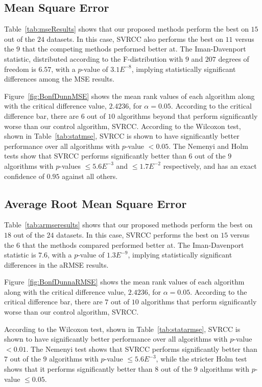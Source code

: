 \documentclass[reqno]{vcuthesis}
\numberwithin{equation}{chapter}
\begin{document}
\subsection{Mean Square Error}\label{subsec:mse}
Table~{\ref{tab:mseResults}} shows that our proposed methods perform the best on $15$ out of the $24$ datasets. In this case, SVRCC also performs the best on $11$ versus the $9$ that the competing methods performed better at. The Iman-Davenport statistic, distributed according to the F-distribution with $9$ and $207$ degrees of freedom is $6.57$, with a $p$-value of $3.1E^{-8}$, implying statistically significant differences among the MSE results.

Figure~{\ref{fig:BonfDunnMSE}} shows the mean rank values of each algorithm along with the critical difference value, $2.4236$, for $\alpha = 0.05$. According to the critical difference bar, there are $6$ out of $10$ algorithms beyond that perform significantly worse than our control algorithm, SVRCC. According to the Wilcoxon test, shown in Table~{\ref{tab:statmse}}, SVRCC is shown to have significantly better performance over all algorithms with $p$-value $< 0.05$. The Nemenyi and Holm tests show that SVRCC performs significantly better than $6$ out of the $9$ algorithms with $p$-values $\leq 5.6E^{-3}$ and $\leq 1.7E^{-2}$ respectively, and has an exact confidence of $0.95$ against all others.

\subsection{Average Root Mean Square Error}\label{subsec:armse}
Table~{\ref{tab:armseresults}} shows that our proposed methods perform the best on $18$ out of the $24$ datasets. In this case, SVRCC performs the best on $15$ versus the $6$ that the methods compared performed better at. The Iman-Davenport statistic is $7.6$, with a $p$-value of $1.3E^{-9}$, implying statistically significant differences in the aRMSE results.

Figure~{\ref{fig:BonfDunnaRMSE}} shows the mean rank values of each algorithm along with the critical difference value, $2.4236$, for $\alpha = 0.05$. According to the critical difference bar, there are $7$ out of $10$ algorithms that perform significantly worse than our control algorithm, SVRCC.

According to the Wilcoxon test, shown in Table~{\ref{tab:statarmse}}, SVRCC is shown to have significantly better performance over all algorithms with $p$-value $< 0.01$. The Nemenyi test shows that SVRCC performs significantly better than $7$ out of the $9$ algorithms with $p$-value $\leq 5.6E^{-3}$, while the stricter Holm test shows that it performs significantly better than $8$ out of the $9$ algorithms with $p$-value $\leq 0.05$.
\end{document}
